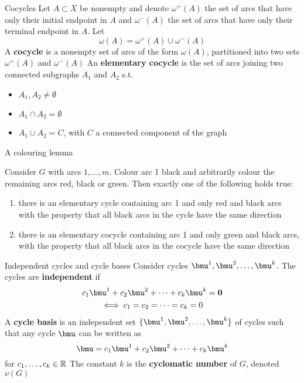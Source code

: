 \documentclass[aspectratio=43]{beamer}
\begin{document}
\begin{frame}{Cocycles}
Let $A\subset X$ be nonempty and denote $\omega^+(A)$ the set of arcs that have only their initial endpoint in $A$ and $\omega^-(A)$ the set of arcs that have only their terminal endpoint in $A$. Let
\[
\omega(A)=\omega^+(A)\cup\omega^-(A)
\]
\vfill
A \textbf{cocycle} is a nonempty set of arcs of the form $\omega(A)$, partitioned into two sets $\omega^+(A)$ and $\omega^-(A)$
\vfill
An \textbf{elementary cocycle} is the set of arcs joining two connected subgraphs $A_1$ and $A_2$ s.t. 
\begin{itemize}
\item $A_1,A_2\neq\emptyset$
\item $A_1\cap A_2=\emptyset$
\item $A_1\cup A_2=C$, with $C$ a connected component of the graph
\end{itemize}
\end{frame}


\begin{frame}{A colouring lemma}
\begin{lemma}\label{lemma:arc_colouring_lemma}
Consider $G$ with arcs $1,\ldots,m$. Colour arc 1 black and arbitrarily colour the remaining arcs red, black or green. Then exactly one of the following holds true:
\begin{enumerate}
\item there is an elementary cycle containing arc 1 and only red and black
arcs with the property that all black arcs in the cycle have the same
direction
\item there is an elementary cocycle containing arc 1 and only green and black
arcs, with the property that all black arcs in the cocycle have the same
direction
\end{enumerate}
\end{lemma}
\end{frame}

\begin{frame}{Independent cycles and cycle bases}
Consider cycles $\bmu^1,\bmu^2,\ldots,\bmu^k$. The cycles are \textbf{independent} if
\begin{multline*}
c_1\bmu^1+c_2\bmu^2+\cdots+c_k\bmu^k=\b0 \\
\iff
c_1=c_2=\cdots=c_k=0
\end{multline*}
A \textbf{cycle basis} is an independent set $\{\bmu^1,\bmu^2,\ldots,\bmu^k\}$ of cycles such that any cycle $\bmu$ can be written as
\[
\bmu= c_1\bmu^1+c_2\bmu^2+\cdots+c_k\bmu^k
\]
for $c_1,\ldots,c_k\in\mathbb{R}$
\vfill
The constant $k$ is the \textbf{cyclomatic number} of $G$, denoted $\nu(G)$
\end{frame}
\end{document}

